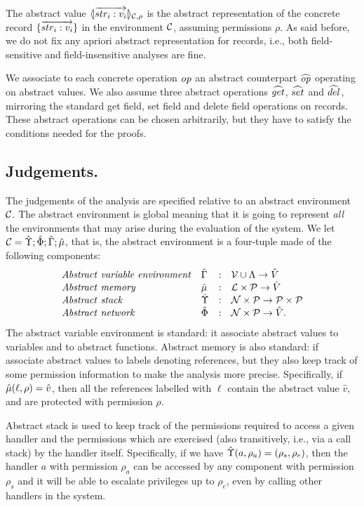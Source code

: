 The abstract value $\langle\!| \overrightarrow{str_i: v_i} |\!\rangle_{{\cal C},\rho}$ is the abstract representation
of the concrete record $\{\overrightarrow{str_i: v_i}\}$ in the environment ${\cal C}$, assuming
permissions $\rho$. As said before, we do not fix any apriori abstract representation
for records, i.e., both field-sensitive and field-insensitive analyses are fine.

We associate to each concrete operation $\mathit{op}$ an abstract counterpart $\widehat{\mathit{op}}$
operating on abstract values. We also assume three abstract operations $\widehat{get}$,
$\widehat{set}$ and $\widehat{del}$, mirroring the standard get field, set field and delete
field operations on records. These abstract operations can be chosen arbitrarily,
but they have to satisfy the conditions needed for the proofs. 

\subsection{Judgements.}  The judgements of the analysis are specified
relative to an abstract environment ${\cal C}$. The abstract environment
is global meaning that it is going to represent \emph{all} the
environments that may arise during the evaluation of the system.
We let ${\cal C}=\hat{\Upsilon} ; \hat{\Phi} ; \hat{\Gamma} ; \hat{\mu}$, that is, the 
abstract environment is a four-tuple made of the following components:
\[
\begin{array}{llcl}
\mathit{Abstract\ variable\ environment} & \hat{\Gamma} & : & \mathcal{V} \cup \Lambda \rightarrow \hat{V} \\
\mathit{Abstract\ memory} & \hat{\mu} & : & {\mathcal L} \times \mathcal{P} \rightarrow \hat{V} \\
\mathit{Abstract\ stack} & \hat{\Upsilon} & : & \mathcal{N} \times \mathcal{P} \rightarrow \mathcal{P} \times \mathcal{P} \\
\mathit{Abstract\ network} & \hat{\Phi} & : & \mathcal{N} \times \mathcal{P} \rightarrow \hat{V}.
\end{array}
\]
The abstract variable environment is standard: it associate abstract values to
variables and to abstract functions. 
Abstract memory is also standard: if associate abstract
values to labels denoting references, but they also keep track of some permission
information to make the analysis more precise. Specifically, 
if $\hat{\mu}(\ell,\rho) = \hat{v}$, then all the references
labelled with $\ell$ contain the abstract value $\hat{v}$, and are protected with permission $\rho$.

Abstract stack is used to keep track of the permissions required to 
access a given handler and the permissions which are exercised 
(also transitively, i.e., via a call stack) by the handler itself. 
Specifically, if we have $\hat{\Upsilon}(a,\rho_a) =
(\rho_s,\rho_e)$, then the handler $a$ with permission $\rho_a$ can be
accessed by any component with permission $\rho_s$ and it will be
able to escalate privileges up to $\rho_e$, even by calling other handlers 
in the system.

